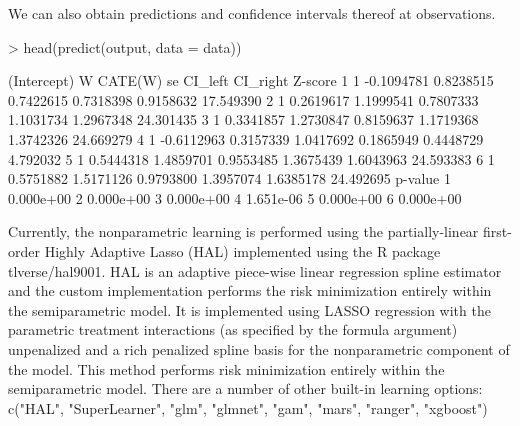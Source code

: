 \documentclass[article]{jss}
\begin{document}
We can also obtain predictions and confidence intervals thereof at observations.
\begin{Schunk}
\begin{Sinput}
> head(predict(output, data = data))
\end{Sinput}
\begin{Soutput}
  (Intercept)          W   CATE(W)        se   CI_left  CI_right   Z-score
1           1 -0.1094781 0.8238515 0.7422615 0.7318398 0.9158632 17.549390
2           1  0.2619617 1.1999541 0.7807333 1.1031734 1.2967348 24.301435
3           1  0.3341857 1.2730847 0.8159637 1.1719368 1.3742326 24.669279
4           1 -0.6112963 0.3157339 1.0417692 0.1865949 0.4448729  4.792032
5           1  0.5444318 1.4859701 0.9553485 1.3675439 1.6043963 24.593383
6           1  0.5751882 1.5171126 0.9793800 1.3957074 1.6385178 24.492695
    p-value
1 0.000e+00
2 0.000e+00
3 0.000e+00
4 1.651e-06
5 0.000e+00
6 0.000e+00
\end{Soutput}
\end{Schunk}

Currently, the nonparametric learning is performed using the partially-linear first-order Highly Adaptive Lasso (HAL) implemented using the R package tlverse/hal9001. HAL is an adaptive piece-wise linear regression spline estimator and the custom implementation performs the risk minimization entirely within the semiparametric model. It is implemented using LASSO regression with the parametric treatment interactions (as specified by the formula argument) unpenalized and a rich penalized spline basis for the nonparametric component of the model. This method performs risk minimization entirely within the semiparametric model. There are a number of other built-in learning options: c("HAL", "SuperLearner", "glm", "glmnet", "gam", "mars", "ranger", "xgboost")
\end{document}
